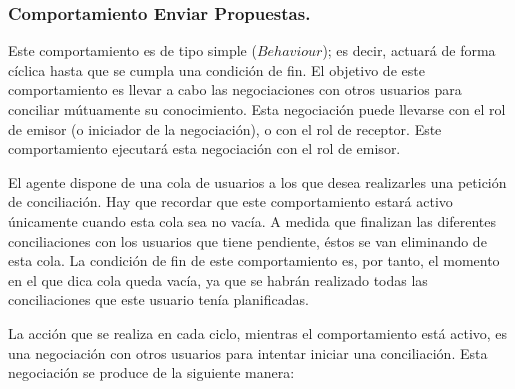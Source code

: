 \subsubsection{Comportamiento Enviar Propuestas.}

Este comportamiento es de tipo simple ($Behaviour$); es decir, actuará de forma cíclica hasta que se cumpla una condición de fin. El objetivo de este comportamiento es llevar a cabo las negociaciones con otros usuarios para conciliar mútuamente su conocimiento. Esta negociación puede llevarse con el rol de emisor (o iniciador de la negociación), o con el rol de receptor. Este comportamiento ejecutará esta negociación con el rol de emisor.

El agente dispone de una cola de usuarios a los que desea realizarles una petición de conciliación. Hay que recordar que este comportamiento estará activo únicamente cuando esta cola sea no vacía. A medida que finalizan las diferentes conciliaciones con los usuarios que tiene pendiente, éstos se van eliminando de esta cola. La condición de fin de este comportamiento es, por tanto, el momento en el que dica cola queda vacía, ya que se habrán realizado todas las conciliaciones que este usuario tenía planificadas.

La acción que se realiza en cada ciclo, mientras el comportamiento está activo, es una negociación con otros usuarios para intentar iniciar una conciliación. Esta negociación se produce de la siguiente manera:


